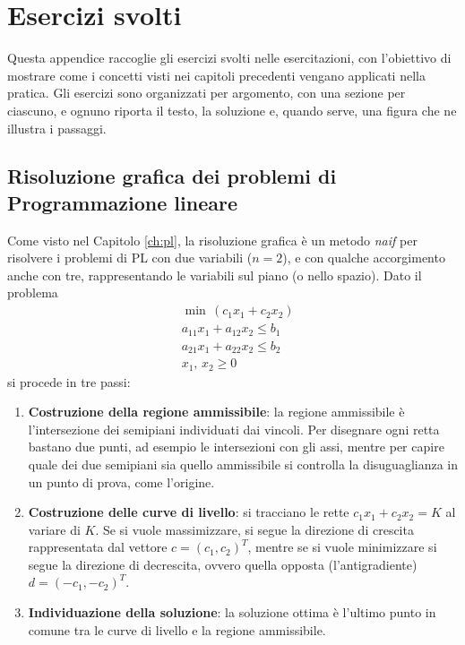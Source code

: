 \chapter{Esercizi svolti}\label{app:esercizi}
Questa appendice raccoglie gli esercizi svolti nelle esercitazioni, con l'obiettivo di mostrare come i concetti visti nei capitoli precedenti vengano applicati nella pratica. Gli esercizi sono organizzati per argomento, con una sezione per ciascuno, e ognuno riporta il testo, la soluzione e, quando serve, una figura che ne illustra i passaggi.

\section{Risoluzione grafica dei problemi di Programmazione lineare}\label{sec:es-grafica}
Come visto nel Capitolo \ref{ch:pl}, la risoluzione grafica è un metodo \emph{naif} per risolvere i problemi di PL con due variabili ($n = 2$), e con qualche accorgimento anche con tre, rappresentando le variabili sul piano (o nello spazio). Dato il problema
\[
\begin{aligned}
&\min\, (c_1 x_1 + c_2 x_2) \\
&a_{11} x_1 + a_{12} x_2 \le b_1 \\
&a_{21} x_1 + a_{22} x_2 \le b_2 \\
&x_1,\, x_2 \ge 0
\end{aligned}
\]
si procede in tre passi:
\begin{enumerate}
    \item \textbf{Costruzione della regione ammissibile}: la regione ammissibile è l'intersezione dei semipiani individuati dai vincoli. Per disegnare ogni retta bastano due punti, ad esempio le intersezioni con gli assi, mentre per capire quale dei due semipiani sia quello ammissibile si controlla la disuguaglianza in un punto di prova, come l'origine.
    \item \textbf{Costruzione delle curve di livello}: si tracciano le rette $c_1 x_1 + c_2 x_2 = K$ al variare di $K$. Se si vuole massimizzare, si segue la direzione di crescita rappresentata dal vettore $c = (c_1, c_2)^T$, mentre se si vuole minimizzare si segue la direzione di decrescita, ovvero quella opposta (l'antigradiente) $d = (-c_1, -c_2)^T$.
    \item \textbf{Individuazione della soluzione}: la soluzione ottima è l'ultimo punto in comune tra le curve di livello e la regione ammissibile.
\end{enumerate}

